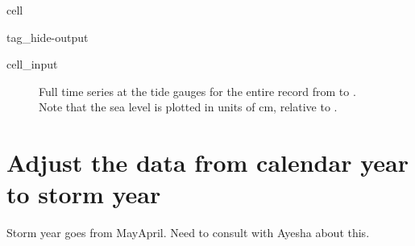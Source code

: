 \documentclass[letterpaper,10pt,english]{jupyterBook}
\begin{document}
\begin{sphinxuseclass}{cell}
\begin{sphinxuseclass}{tag_hide-output}
\begin{sphinxVerbatimInput}
\begin{sphinxuseclass}{cell_input}
\begin{sphinxVerbatim}[commandchars=\\\{\}]
\PYG{p}{[} \PYG{p}{]}



\end{sphinxVerbatim}

\end{sphinxuseclass}\end{sphinxVerbatimInput}

\end{sphinxuseclass}
\end{sphinxuseclass}
\begin{figure}[htbp]
\centering
\capstart

\noindent{}
\caption{Full time series at the  tide gauges for the entire record from  to . Note that the sea level is plotted in units of cm, relative to .}\label{\detokenize{notebooks/FloodFrequency:fig-ts-full}}\end{figure}


\chapter{Adjust the data from calendar year to storm year}
\label{\detokenize{notebooks/FloodFrequency:adjust-the-data-from-calendar-year-to-storm-year}}
\sphinxAtStartPar
Storm year goes from May\sphinxhyphen{}April. Need to consult with Ayesha about this.
\end{document}
